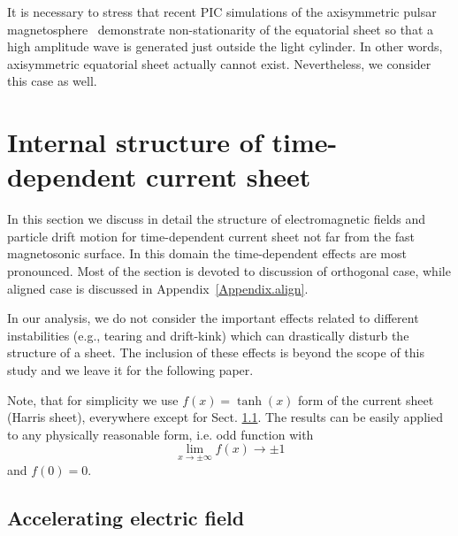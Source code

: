 \documentclass[useAMS,usenatbib]{mn2e}
\newcommand\cmtla[1]{{\color{red}[LA: #1]}}
\begin{document}
It is necessary to stress that recent PIC simulations of the axisymmetric
pulsar magnetosphere~\citep{2015MNRAS.448..606C} demonstrate non-stationarity of the equatorial
sheet so that a high amplitude wave is generated just outside the light cylinder. 
In other words, axisymmetric equatorial sheet actually cannot exist. Nevertheless,
we consider this case as well.

\section{Internal structure of time-dependent current sheet}
\label{sect:IntStruct}

In this section we discuss in detail the structure of electromagnetic fields 
and particle drift motion for time-dependent current sheet { not far 
from the fast magnetosonic surface. In this domain the time-dependent effects 
are most pronounced. Most of the section is devoted to discussion of orthogonal 
case, while aligned case is discussed in Appendix~\ref{Appendix.align}.}

{ In our analysis, we do not consider the important effects related to different instabilities (e.g., tearing and drift-kink) which can drastically disturb the structure of a sheet. The inclusion of these effects is beyond the scope of this study and we leave it for the following paper.}

Note, that for simplicity we use $f(x) = \tanh(x)$ form of the current sheet 
(Harris sheet),  everywhere except for Sect. \ref{sect.A.E.F.}. The results 
can be easily applied to any physically reasonable form, i.e. odd function with 
\begin{equation}
\lim\limits_{x\rightarrow \pm \infty}f(x)\rightarrow \pm 1 
\nonumber
\end{equation}
and  $f(0)=0$. 

\subsection{Accelerating electric field}
\label{sect.A.E.F.}
\end{document}

